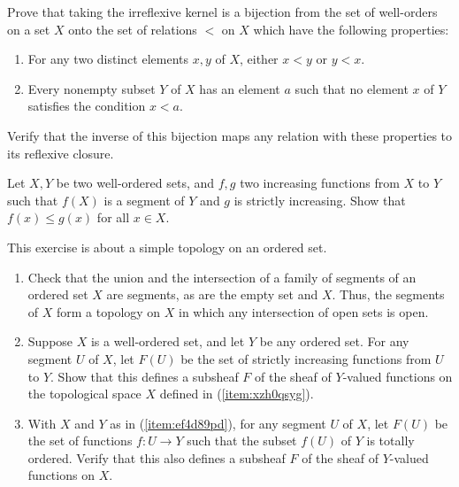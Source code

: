 \documentclass{article}
\begin{document}
\begin{exercise}
  \label{exe:4q4vnvbc}
  Prove that taking the irreflexive kernel is a bijection from the set
  of well-orders on a set \(X\) onto the set of relations \(<\) on
  \(X\) which have the following properties:
  \begin{enumerate}
  \item For any two distinct elements \(x, y\) of \(X\), either
    \(x < y\) or \(y < x\).
  \item Every nonempty subset \(Y\) of \(X\) has an element \(a\) such
    that no element \(x\) of \(Y\) satisfies the condition \(x < a\).
  \end{enumerate}
  Verify that the inverse of this bijection maps any relation with
  these properties to its reflexive closure.
\end{exercise}

\begin{exercise}
  \label{exe:gsdhavsp}
  Let \(X, Y\) be two well-ordered sets, and \(f, g\) two increasing
  functions from \(X\) to \(Y\) such that \(f(X)\) is a segment of
  \(Y\) and \(g\) is strictly increasing.  Show that
  \(f(x) \leq g(x)\) for all \(x \in X\).
\end{exercise}

\begin{exercise}
  \label{exe:rpm18mof}
  This exercise is about a simple topology on an ordered set.
  \begin{enumerate}
  \item \label{item:xzh0qsyg} Check that the union and the
    intersection of a family of segments of an ordered set \(X\) are
    segments, as are the empty set and \(X\).  Thus, the segments of
    \(X\) form a topology on \(X\) in which any intersection of open
    sets is open.
  \item \label{item:ef4d89pd} Suppose \(X\) is a well-ordered set, and
    let \(Y\) be any ordered set.  For any segment \(U\) of \(X\), let
    \(F(U)\) be the set of strictly increasing functions from \(U\) to
    \(Y\).  Show that this defines a subsheaf \(F\) of the sheaf of
    \(Y\)-valued functions on the topological space \(X\) defined in
    (\ref{item:xzh0qsyg}).
  \item With \(X\) and \(Y\) as in (\ref{item:ef4d89pd}), for any
    segment \(U\) of \(X\), let \(F(U)\) be the set of functions
    \(f : U \to Y\) such that the subset \(f(U)\) of \(Y\) is totally
    ordered.  Verify that this also defines a subsheaf \(F\) of the
    sheaf of \(Y\)-valued functions on \(X\).
  \end{enumerate}
\end{exercise}
\end{document}
